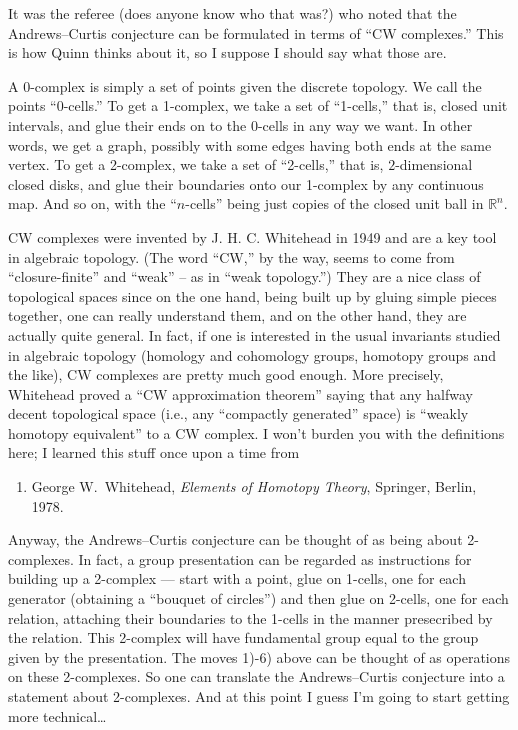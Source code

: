 \documentclass{article}
\def\tightlist{}
\begin{document}
It was the referee (does anyone know who that was?) who noted that the
Andrews--Curtis conjecture can be formulated in terms of ``CW
complexes.'' This is how Quinn thinks about it, so I suppose I should
say what those are.

A 0-complex is simply a set of points given the discrete topology. We
call the points ``0-cells.'' To get a 1-complex, we take a set of
``1-cells,'' that is, closed unit intervals, and glue their ends on to
the 0-cells in any way we want. In other words, we get a graph, possibly
with some edges having both ends at the same vertex. To get a 2-complex,
we take a set of ``2-cells,'' that is, \(2\)-dimensional closed disks,
and glue their boundaries onto our 1-complex by any continuous map. And
so on, with the ``\(n\)-cells'' being just copies of the closed unit
ball in \(\mathbb{R}^n\).

CW complexes were invented by J. H. C. Whitehead in 1949 and are a key
tool in algebraic topology. (The word ``CW,'' by the way, seems to come
from ``closure-finite'' and ``weak'' -- as in ``weak topology.'') They
are a nice class of topological spaces since on the one hand, being
built up by gluing simple pieces together, one can really understand
them, and on the other hand, they are actually quite general. In fact,
if one is interested in the usual invariants studied in algebraic
topology (homology and cohomology groups, homotopy groups and the like),
CW complexes are pretty much good enough. More precisely, Whitehead
proved a ``CW approximation theorem'' saying that any halfway decent
topological space (i.e., any ``compactly generated'' space) is ``weakly
homotopy equivalent'' to a CW complex. I won't burden you with the
definitions here; I learned this stuff once upon a time from

\begin{enumerate}
\def\labelenumi{\arabic{enumi})}
\setcounter{enumi}{3}
\tightlist
\item
   George W.\ Whitehead,  \emph{Elements of Homotopy Theory},
  Springer, Berlin, 1978. 
\end{enumerate}

Anyway, the Andrews--Curtis conjecture can be thought of as being about
2-complexes. In fact, a group presentation can be regarded as
instructions for building up a 2-complex --- start with a point, glue on
1-cells, one for each generator (obtaining a ``bouquet of circles'') and
then glue on 2-cells, one for each relation, attaching their boundaries
to the 1-cells in the manner presecribed by the relation. This 2-complex
will have fundamental group equal to the group given by the
presentation. The moves 1)-6) above can be thought of as operations on
these 2-complexes. So one can translate the Andrews--Curtis conjecture
into a statement about 2-complexes. And at this point I guess I'm going
to start getting more technical\ldots{}
\end{document}
